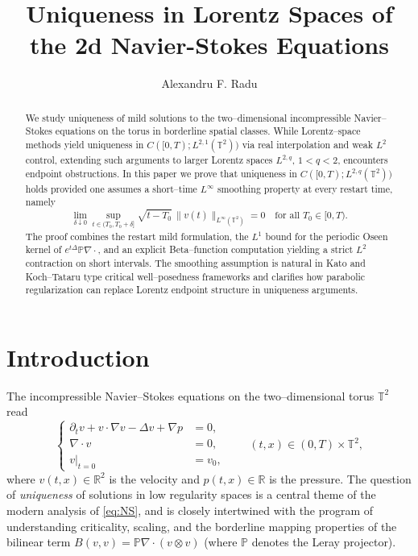 \documentclass[12pt]{article}
\newcommand{\R}{\mathbb{R}}
\newcommand{\T}{\mathbb{T}}
\theoremstyle{remark}
\theoremstyle{remark}
\begin{document}
\author{Alexandru F. Radu}
\title{Uniqueness in Lorentz Spaces of the 2d Navier-Stokes Equations}
\maketitle

\begin{abstract}
We study uniqueness of mild solutions to the two--dimensional incompressible Navier--Stokes equations on the torus in borderline spatial classes. While Lorentz--space methods yield uniqueness in $C([0,T);L^{2,1}(\T^2))$ via real interpolation and weak $L^2$ control, extending such arguments to larger Lorentz spaces $L^{2,q}$, $1<q<2$, encounters endpoint obstructions. In this paper we prove that uniqueness in $C([0,T);L^{2,q}(\T^2))$ holds provided one assumes a short--time $L^\infty$ smoothing property at every restart time, namely
\[
\lim_{\delta\downarrow 0}\sup_{t\in(T_0,T_0+\delta]}\sqrt{t-T_0}\,\|v(t)\|_{L^\infty(\T^2)}=0
\quad \text{for all } T_0\in[0,T).
\]
The proof combines the restart mild formulation, the $L^1$ bound for the periodic Oseen kernel of $e^{t\Delta}\mathbb{P}\nabla\cdot$, and an explicit Beta--function computation yielding a strict $L^2$ contraction on short intervals. The smoothing assumption is natural in Kato and Koch--Tataru type critical well--posedness frameworks and clarifies how parabolic regularization can replace Lorentz endpoint structure in uniqueness arguments.
\end{abstract}

\section{Introduction}


The incompressible Navier--Stokes equations on the two--dimensional torus $\T^2$ read
\begin{equation}\label{eq:NS}
\left\{
\begin{aligned}
\partial_t v + v\cdot\nabla v - \Delta v + \nabla p &= 0, \\
\nabla\cdot v &= 0,\\
v|_{t=0} &= v_0,
\end{aligned}
\right.
\qquad (t,x)\in (0,T)\times \T^2,
\end{equation}
where $v(t,x)\in\R^2$ is the velocity and $p(t,x)\in\R$ is the pressure. The question of
\emph{uniqueness} of solutions in low regularity spaces is a central theme of the modern
analysis of \eqref{eq:NS}, and is closely intertwined with the program of understanding
criticality, scaling, and the borderline mapping properties of the bilinear term
$B(v,v)=\mathbb{P}\nabla\cdot(v\otimes v)$ (where $\mathbb{P}$ denotes the Leray projector).
\end{document}
